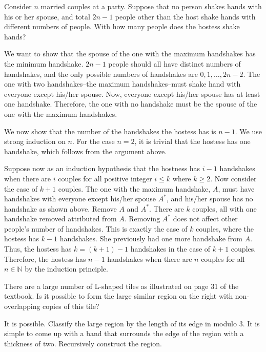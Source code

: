 \documentclass[../main.tex]{subfiles}
\begin{document}
\begin{prob}
    Consider $n$ married couples at a party.
    Suppose that no person shakes hands with his or her spouse, and total $2n - 1$ people other than the host shake hands with different numbers of people.
    With how many people does the hostess shake hands?
\end{prob}
\begin{sol}
    We want to show that the spouse of the one with the maximum handshakes has the minimum handshake.
    $2n - 1$ people should all have distinct numbers of handshakes, and the only possible numbers of handshakes are $0, 1, \dots, 2n - 2$.
    The one with two handshakes--the maximum handshakes--must shake hand with everyone except his/her spouse.
    Now, everyone except his/her spouse has at least one handshake.
    Therefore, the one with no handshake must be the spouse of the one with the maximum handshakes.

    We now show that the number of the handshakes the hostess has is $n - 1$.
    We use strong induction on $n$.
    For the case $n = 2$, it is trivial that the hostess has one handshake, which follows from the argument above.

    Suppose now as an induction hypothesis that the hostness has $i - 1$ handshakes when there are $i$ couples for all positive integer $i \leq k$ where $k \geq 2$.
    Now consider the case of $k + 1$ couples.
    The one with the maximum handshake, $A$, must have handshakes with everyone except his/her spouse $A^*$, and his/her spouse has no handshake as shown above.
    Remove $A$ and $A^*$.
    There are $k$ couples, all with one handshake removed attributed from $A$.
    Removing $A^*$ does not affect other people's number of handshakes.
    This is exactly the case of $k$ couples, where the hostess has $k - 1$ handshakes.
    She previously had one more handshake from $A$.
    Thus, the hostess has $k = (k + 1) - 1$ handshakes in the case of $k + 1$ couples.
    Therefore, the hostess has $n - 1$ handshakes when there are $n$ couples for all $n \in \mathbb N$ by the induction principle.
\end{sol}

\begin{prob} 
    There are a large number of L-shaped tiles as illustrated on page 31 of the textbook.
    Is it possible to form the large similar region on the right with non-overlapping copies of this tile?
\end{prob}
\begin{sol}
    It is possible.
    Classify the large region by the length of its edge in modulo 3.
    It is simple to come up with a band that surrounds the edge of the region with a thickness of two.
    Recursively construct the region.
\end{sol}
\end{document}
